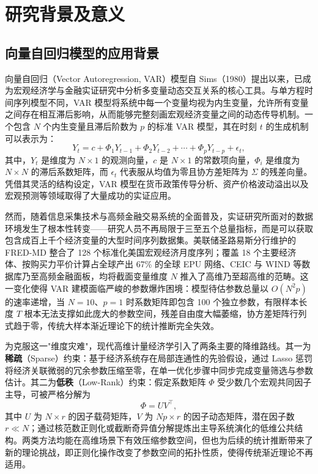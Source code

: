 \section{研究背景及意义}

\subsection{向量自回归模型的应用背景}

向量自回归（Vector Autoregression, VAR）模型自 Sims（1980）提出以来，已成为宏观经济学与金融实证研究中分析多变量动态交互关系的核心工具。与单方程时间序列模型不同，VAR 模型将系统中每一个变量均视为内生变量，允许所有变量之间存在相互滞后影响，从而能够完整刻画宏观经济变量之间的动态传导机制。一个包含 $N$ 个内生变量且滞后阶数为 $p$ 的标准 VAR 模型，其在时刻 $t$ 的生成机制可以表示为：
\begin{equation}
Y_{t}=c+\Phi_{1}Y_{t-1}+\Phi_{2}Y_{t-2}+\cdots+\Phi_{p}Y_{t-p}+\epsilon_{t},
\end{equation}
其中，$Y_t$ 是维度为 $N \times 1$ 的观测向量，$c$ 是 $N \times 1$ 的常数项向量，$\Phi_i$ 是维度为 $N \times N$ 的滞后系数矩阵，而 $\epsilon_t$ 代表服从均值为零且协方差矩阵为 $\Sigma$ 的残差向量。凭借其灵活的结构设定，VAR 模型在货币政策传导分析、资产价格波动溢出以及宏观预测等领域取得了大量成功的实证应用。

然而，随着信息采集技术与高频金融交易系统的全面普及，实证研究所面对的数据环境发生了根本性转变——研究人员不再局限于三至五个总量指标，而是可以获取包含成百上千个经济变量的大型时间序列数据集。美联储圣路易斯分行维护的 FRED-MD 整合了 128 个标准化美国宏观经济月度序列；覆盖 18 个主要经济体、按购买力平价计算占全球产出 67\% 的全球 EPU 网络、CEIC 与 WIND 等数据库乃至高频金融面板，均将截面变量维度 $N$ 推入了高维乃至超高维的范畴。这一变化使得 VAR 建模面临严峻的参数爆炸困境：模型待估参数总量以 $O(N^2p)$ 的速率递增，当 $N=10$、$p=1$ 时系数矩阵即包含 100 个独立参数，有限样本长度 $T$ 根本无法支撑如此庞大的参数空间，残差自由度大幅萎缩，协方差矩阵行列式趋于零，传统大样本渐近理论下的统计推断完全失效。

为克服这一"维度灾难"，现代高维计量经济学引入了两条主要的降维路线。其一为\textbf{稀疏}（Sparse）约束：基于经济系统存在局部连通性的先验假设，通过 Lasso 惩罚将经济关联微弱的冗余参数压缩至零，在单一优化步骤中同步完成变量筛选与参数估计。其二为\textbf{低秩}（Low-Rank）约束：假定系数矩阵 $\Phi$ 受少数几个宏观共同因子主导，可被严格分解为
\begin{equation}
\Phi = U V^{\top},
\end{equation}
其中 $U$ 为 $N \times r$ 的因子载荷矩阵，$V$ 为 $Np \times r$ 的因子动态矩阵，潜在因子数 $r \ll N$；通过核范数正则化或截断奇异值分解提炼出主导系统演化的低维公共结构。两类方法均能在高维场景下有效压缩参数空间，但也为后续的统计推断带来了新的理论挑战，即正则化操作改变了参数空间的拓扑性质，使得传统渐近理论不再适用。

